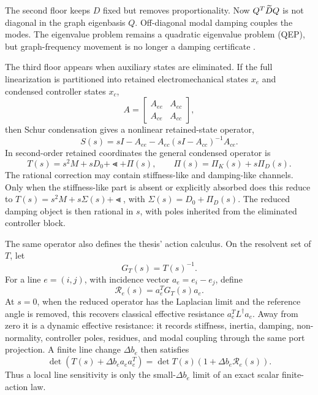 The second floor keeps \(D\) fixed but removes proportionality. Now
\(Q^T\widetilde D Q\) is not diagonal in the graph eigenbasis \(Q\). Off-diagonal modal
damping couples the modes. The eigenvalue problem remains a quadratic
eigenvalue problem (QEP), but graph-frequency movement is no longer a damping
certificate \cite{tisseur2001qep}.

The third floor appears when auxiliary states are eliminated. If the full
linearization is partitioned into retained electromechanical states \(x_e\) and
condensed controller states \(x_c\),
\begin{equation}
  A=
  \begin{bmatrix}
    A_{ee} & A_{ec}\\
    A_{ce} & A_{cc}
  \end{bmatrix},
  \label{eq:intro_partition}
\end{equation}
then Schur condensation gives a nonlinear retained-state operator,
\begin{equation}
  S(s)=sI-A_{ee}-A_{ec}(sI-A_{cc})^{-1}A_{ce}.
  \label{eq:intro_schur}
\end{equation}
In second-order retained coordinates the general condensed operator is
\begin{equation}
  T(s)=s^2M+sD_0+\Lt+\Pi(s),
  \qquad
  \Pi(s)=\Pi_K(s)+s\Pi_D(s).
  \label{eq:intro_sigma}
\end{equation}
The rational correction may contain stiffness-like and damping-like channels.
Only when the stiffness-like part is absent or explicitly absorbed does this
reduce to \(T(s)=s^2M+s\Sigma(s)+\Lt\), with
\(\Sigma(s)=D_0+\Pi_D(s)\). The reduced damping object is then rational in
\(s\), with poles inherited from the eliminated controller block.

The same operator also defines the thesis' action calculus. On the resolvent
set of \(T\), let
\begin{equation}
  G_T(s)=T(s)^{-1}.
  \label{eq:intro_green_function}
\end{equation}
For a line \(e=(i,j)\), with incidence vector \(a_e=e_i-e_j\), define
\begin{equation}
  \mathcal R_e(s)=a_e^TG_T(s)a_e .
  \label{eq:intro_dynamic_resistance}
\end{equation}
At \(s=0\), when the reduced operator has the Laplacian limit and the reference
angle is removed, this recovers classical effective resistance
\(a_e^TL^\dagger a_e\). Away from zero it is a dynamic effective resistance:
it records stiffness, inertia, damping, non-normality, controller poles,
residues, and modal coupling through the same port projection. A finite line
change \(\Delta b_e\) then satisfies
\begin{equation}
  \det(T(s)+\Delta b_ea_ea_e^T)
  =
  \det T(s)\left(1+\Delta b_e\mathcal R_e(s)\right).
  \label{eq:intro_line_action_law}
\end{equation}
Thus a local line sensitivity is only the small-\(\Delta b_e\) limit of an
exact scalar finite-action law.


